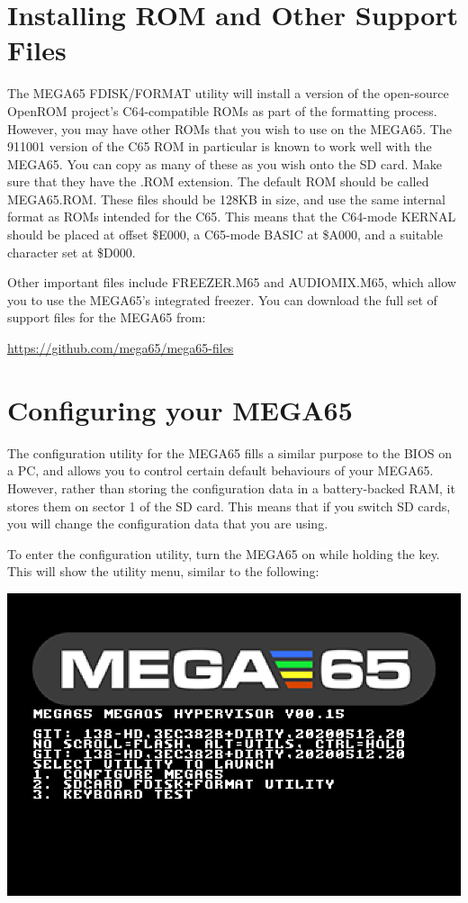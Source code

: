 \section{Installing ROM and Other Support Files}

The MEGA65 FDISK/FORMAT utility will install a version of the
open-source OpenROM project's C64-compatible ROMs as part of the
formatting process. However, you may have other ROMs that you wish to
use on the MEGA65. The 911001 version of the C65 ROM in
particular is known to work well with the MEGA65.
You can copy as many of these as you wish onto the
SD card.  Make sure that they have the .ROM extension.  The default ROM
should be called MEGA65.ROM.  These files
should be 128KB in size, and use the same internal format as ROMs
intended for the C65.  This means that the C64-mode KERNAL should be
placed at offset \$E000, a C65-mode BASIC at \$A000, and a suitable
character set at \$D000.  

Other important files include FREEZER.M65 and AUDIOMIX.M65, which
allow you to use the MEGA65's integrated freezer.  You can download
the full set of support files for the MEGA65 from:

\url{https://github.com/mega65/mega65-files}

\section{Configuring your MEGA65}

The configuration utility for the MEGA65 fills a similar purpose to the BIOS on a
PC, and allows you to control certain default behaviours of your
MEGA65. However, rather than storing the configuration data in a
battery-backed RAM, it stores them on sector 1 of the SD card. This means
that if you switch SD cards, you will change the configuration data that you are using.

To enter the configuration utility, turn the MEGA65 on while
holding the  key.  This will show the utility menu,
similar to the following:

\includegraphics[width=\linewidth]{images/ss-utilmenu.png}

